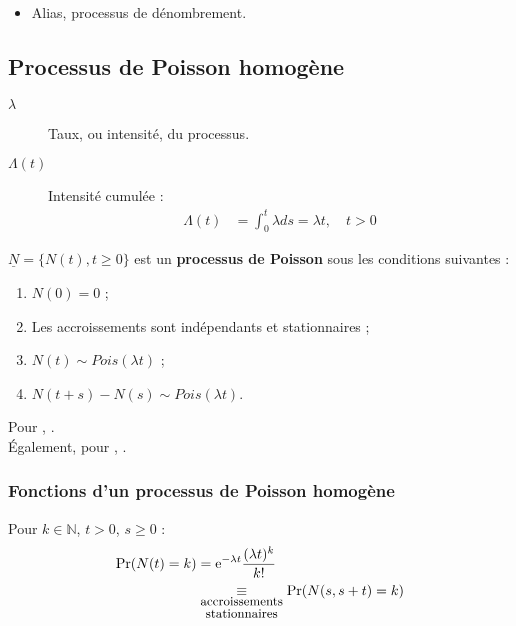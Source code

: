 \documentclass[10pt, french]{article}
\begin{document}
\begin{multicols*}{2}
\begin{definitionNOHFILL}
\begin{itemize}
	\item	Alias, processus de dénombrement.
\end{itemize}
\end{definitionNOHFILL}


\columnbreak
\subsection{Processus de Poisson homogène}
\begin{distributions}[Notation]
\begin{description}
	\item[$\lambda$]	Taux, ou intensité, du processus.
	\item[$\Lambda(t)$]	Intensité cumulée :
		\begin{align*}
		\Lambda(t)
		&=	\int_{0}^{t} \lambda ds
		=	\lambda t, \quad t > 0
		\end{align*}
\end{description}
\end{distributions}

\begin{definitionNOHFILLsub}
$\underline{N}	=	\{N(t), t \geq 0\}$ est un \textbf{processus de Poisson} sous les conditions suivantes :
\begin{enumerate}
	\item	$N(0)	=	0$ ;
	\item	Les accroissements sont indépendants et stationnaires ;
	\item	$N(t)	\sim	Pois(\lambda t)$ ;
	\item	$N(t + s) - N(s) \sim Pois(\lambda t)$.
\end{enumerate}
\end{definitionNOHFILLsub}

Pour , \lfbox[formula]{$N(s, s + t]	=	N(s + t)	-	N(s)$}.\\
Également, pour , \lfbox[formula]{$\Lambda(s, s + t]	=	\Lambda(s + t)	-	\Lambda(s)$}.

\subsubsection*{Fonctions d'un processus de Poisson homogène}
Pour $k \in \mathbb{N}$, $t > 0$, $s \geq 0$ :
\begin{align*}
	\Pr(N(t)	=	k)
	&=	\textrm{e}^{-\lambda t} \frac{(\lambda t)^{k}}{k!}	\\
	&\underset{\small\shortstack{accroissements\\ stationnaires}}{\equiv} \Pr(N(s, s + t)	=	k)
\end{align*}



\end{multicols*}
\end{document}
